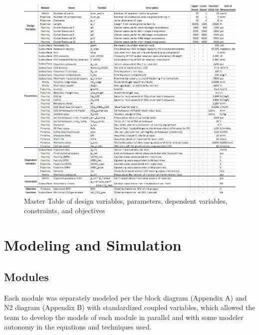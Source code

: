 \documentclass[balance,upint,subscriptcorrection,varvw,mathalfa=cal=boondoxo,spanish,french,vietnamese,russian,greek,pdf-a,colorlinks]{asmeconf}
\begin{document}
\begin{figure}[btp]
\centering\includegraphics[width=0.95\linewidth]{images/Master_Table_v4.jpg}
\caption{Master Table of design variables, parameters, dependent variables, constraints, and objectives }\label{master_table:1}
\end{figure}

\section{Modeling and Simulation}
\subsection{Modules} 
Each module was separately modeled per the block diagram (Appendix A) and N2 diagram (Appendix B) with standardized coupled variables, which allowed the team to develop the models of each module in parallel and with some modeler autonomy in the equations and techniques used.
\end{document}
